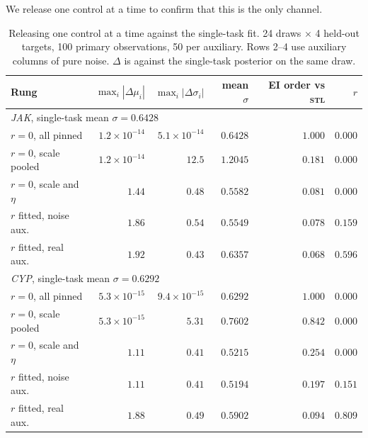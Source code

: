\documentclass[11pt]{article}
\newcommand{\stl}{\textsc{stl}}
\begin{document}
We release one control at a time to confirm that this is the only channel.

\begin{table}[ht]
\centering\small
\begin{tabular}{lrrrrr}
\toprule
Rung & $\max_i|\Delta\mu_i|$ & $\max_i|\Delta\sigma_i|$ & mean $\sigma$
     & EI order vs \stl{} & $r$ \\
\midrule
\multicolumn{6}{l}{\emph{JAK}, single-task mean $\sigma = 0.6428$} \\
$r=0$, all pinned        & $1.2\!\times\!10^{-14}$ & $5.1\!\times\!10^{-14}$ & $0.6428$ & $1.000$ & $0.000$ \\
$r=0$, scale pooled      & $1.2\!\times\!10^{-14}$ & $\mathbf{12.5}$          & $1.2045$ & $\mathbf{0.181}$ & $0.000$ \\
$r=0$, scale and $\eta$  & $1.44$                  & $0.48$                   & $0.5582$ & $0.081$ & $0.000$ \\
$r$ fitted, noise aux.\  & $1.86$                  & $0.54$                   & $0.5549$ & $0.078$ & $0.159$ \\
$r$ fitted, real aux.\   & $1.92$                  & $0.43$                   & $0.6357$ & $0.068$ & $0.596$ \\
\midrule
\multicolumn{6}{l}{\emph{CYP}, single-task mean $\sigma = 0.6292$} \\
$r=0$, all pinned        & $5.3\!\times\!10^{-15}$ & $9.4\!\times\!10^{-15}$ & $0.6292$ & $1.000$ & $0.000$ \\
$r=0$, scale pooled      & $5.3\!\times\!10^{-15}$ & $\mathbf{5.31}$          & $0.7602$ & $\mathbf{0.842}$ & $0.000$ \\
$r=0$, scale and $\eta$  & $1.11$                  & $0.41$                   & $0.5215$ & $0.254$ & $0.000$ \\
$r$ fitted, noise aux.\  & $1.11$                  & $0.41$                   & $0.5194$ & $0.197$ & $0.151$ \\
$r$ fitted, real aux.\   & $1.88$                  & $0.49$                   & $0.5902$ & $0.094$ & $0.809$ \\
\bottomrule
\end{tabular}
\caption{Releasing one control at a time against the single-task fit. 24 draws
$\times$ 4 held-out targets, 100 primary observations, 50 per auxiliary. Rows
2--4 use auxiliary columns of pure noise. $\Delta$ is against the single-task
posterior on the same draw.}
\label{tab:mechanism}
\end{table}
\end{document}
